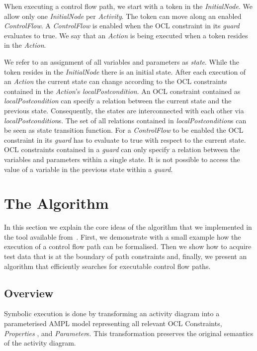 \documentclass[runningheads,a4paper]{llncs}%
\newcommand{\UMLType}[1]{\textsf{\textit{#1}}} %
\newcommand{\UMLReference}[1]{\textsf{\textit{#1}}} %
\begin{document}
When executing a control flow path, we start with a token in the
\UMLType{InitialNode}. We allow only one \UMLType{InitialNode} per
\UMLType{Activity}. The token can move along an enabled \UMLType{ControlFlow}. A
\UMLType{ControlFlow} is enabled when the OCL constraint in its
\UMLReference{guard} evaluates to true. We say that an \UMLType{Action} is being
executed when a token resides in the \UMLType{Action}.

We refer to an assignment of all variables and parameters as \emph{state}. While
the token resides in the \UMLType{InitialNode} there is an initial state. After
each execution of an \UMLType{Action} the current state can change according to
the OCL constraints contained in the \UMLType{Action}'s
\UMLReference{localPostcondition}. An OCL constraint contained as
\UMLType{localPostcondition} can specify a relation between the current state
and the previous state. Consequently, the states are interconnected with each
other via \UMLReference{localPostcondition}s. The set of all relations contained
in \UMLType{localPostcondition}s can be seen as state transition function. For a
\UMLType{ControlFlow} to be enabled the OCL constraint in its
\UMLReference{guard} has to evaluate to true with respect to the current state.
OCL constraints contained in a \UMLReference{guard} can only specify a relation
between the variables and parameters within a single state. It is not possible
to access the value of a variable in the previous state within a
\UMLReference{guard}.
%
\section{The Algorithm}%
\label{sec:Algorithm}%
In this section we explain the core ideas of the algorithm that we implemented
in the tool available from~\cite{PartegWebsite}. First, we demonstrate with a
small example how the execution of a control flow path can be formalised. Then
we show how to acquire test data that is at the boundary of path constraints
and, finally, we present an algorithm that efficiently searches for executable
control flow paths.%
%
\subsection{Overview}%
Symbolic execution is done by transforming an activity diagram into a
parameterised AMPL model representing all relevant OCL Constraints,
\UMLType{Properties} , and \UMLType{Parameter}s. This transformation preserves
the original semantics of the activity diagram.
\end{document}
